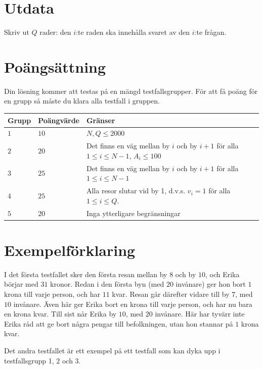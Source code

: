 \section*{Utdata}
Skriv ut $Q$ rader: den $i$:te raden ska innehålla svaret av den $i$:te frågan.

\section*{Poängsättning}
Din lösning kommer att testas på en mängd testfallsgrupper.
För att få poäng för en grupp så måste du klara alla testfall i gruppen.

\noindent
\begin{tabular}{| l | l | p{12cm} |}
  \hline
  Grupp & Poängvärde & Gränser \\ \hline
  $1$   & $10$       & $N,Q \leq 2000$\\ \hline
  $2$   & $20$       & Det finns en väg mellan by $i$ och by $i+1$ för alla $1 \leq i \leq N-1$, $A_i \leq 100$\\ \hline
  $3$   & $25$       & Det finns en väg mellan by $i$ och by $i+1$ för alla $1 \leq i \leq N-1$ \\ \hline
  $4$   & $25$       & Alla resor slutar vid by 1, d.v.s. $v_i=1$ för alla $1 \leq i \leq Q$. \\ \hline
  $5$   & $20$       & Inga ytterligare begränsningar \\ \hline
\end{tabular}

\section {Exempelförklaring}
I det första testfallet sker den första resan mellan by $8$ och by $10$, och Erika börjar med $31$ kronor.
Redan i den första byn (med $20$ invånare) ger hon bort $1$ krona till varje person, och har $11$ kvar.
Resan går därefter vidare till by $7$, med $10$ invånare. Även här ger Erika bort en krona till varje person, och har nu bara en krona kvar.
Till sist når Erika by $10$, med $20$ invånare. Här har tyvärr inte Erika råd att ge bort några pengar till befolkningen, utan hon stannar på $1$ krona kvar.

Det andra testfallet är ett exempel på ett testfall som kan dyka upp i testfallsgrupp 1, 2 och 3.
